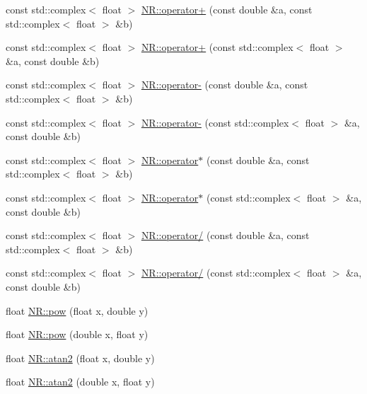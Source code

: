 \begin{DoxyCompactItemize}
\item 
const std\+::complex$<$ float $>$ \mbox{\hyperlink{namespaceNR_ad2f255483b92a41caf84daa8e4fb4f2d}{N\+R\+::operator+}} (const double \&a, const std\+::complex$<$ float $>$ \&b)
\item 
const std\+::complex$<$ float $>$ \mbox{\hyperlink{namespaceNR_a248dbe3651d0e72fea48fde8c29d03c1}{N\+R\+::operator+}} (const std\+::complex$<$ float $>$ \&a, const double \&b)
\item 
const std\+::complex$<$ float $>$ \mbox{\hyperlink{namespaceNR_ad075d6845549afa367e8eabac06de42c}{N\+R\+::operator-\/}} (const double \&a, const std\+::complex$<$ float $>$ \&b)
\item 
const std\+::complex$<$ float $>$ \mbox{\hyperlink{namespaceNR_a24cad7076ed686ce43abaceed12e4a91}{N\+R\+::operator-\/}} (const std\+::complex$<$ float $>$ \&a, const double \&b)
\item 
const std\+::complex$<$ float $>$ \mbox{\hyperlink{namespaceNR_abe1bfc853e642c91a1084cd7cc55da26}{N\+R\+::operator$\ast$}} (const double \&a, const std\+::complex$<$ float $>$ \&b)
\item 
const std\+::complex$<$ float $>$ \mbox{\hyperlink{namespaceNR_a39e0a171e9227121881368e4c636fd97}{N\+R\+::operator$\ast$}} (const std\+::complex$<$ float $>$ \&a, const double \&b)
\item 
const std\+::complex$<$ float $>$ \mbox{\hyperlink{namespaceNR_a3b52a0a9d6e4087547b3be89ce0c646b}{N\+R\+::operator/}} (const double \&a, const std\+::complex$<$ float $>$ \&b)
\item 
const std\+::complex$<$ float $>$ \mbox{\hyperlink{namespaceNR_a56ac51a96939b7cb972bb84871a7dce4}{N\+R\+::operator/}} (const std\+::complex$<$ float $>$ \&a, const double \&b)
\item 
float \mbox{\hyperlink{namespaceNR_a519f9a284cc5f48e57acafa04ad862df}{N\+R\+::pow}} (float x, double y)
\item 
float \mbox{\hyperlink{namespaceNR_a7d26b090a44a3b527619df12b89923c9}{N\+R\+::pow}} (double x, float y)
\item 
float \mbox{\hyperlink{namespaceNR_afbe2717cf898de31cf6e00b84bfc3e8f}{N\+R\+::atan2}} (float x, double y)
\item 
float \mbox{\hyperlink{namespaceNR_a2f18cc48b4090d59c9cfdcb2ecc45e20}{N\+R\+::atan2}} (double x, float y)
\end{DoxyCompactItemize}
